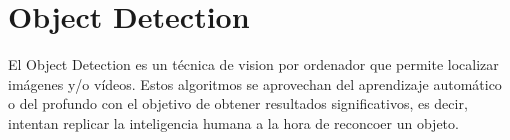 

\section{Object Detection}

El Object Detection \cite{objectDetect} es un técnica de vision por ordenador que permite localizar imágenes y/o vídeos. Estos algoritmos se aprovechan del aprendizaje automático o del profundo 
con el objetivo de obtener resultados significativos, es decir, intentan replicar la inteligencia humana a la hora de reconcoer un objeto.

